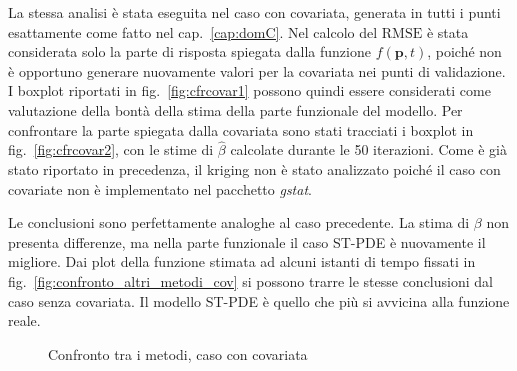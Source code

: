 \documentclass[a4paper,11pt,twoside,openright]{book}							%
\begin{document}
La stessa analisi è stata eseguita nel caso con covariata, generata in tutti i punti esattamente come fatto nel cap.~\ref{cap:domC}. Nel calcolo del $\mathrm{RMSE}$ è stata considerata solo la parte di risposta spiegata dalla funzione $f(\bm p,t)$, poiché non è opportuno generare nuovamente valori per la covariata nei punti di validazione. I boxplot riportati in fig.~\ref{fig:cfrcovar1} possono quindi essere considerati come valutazione della bontà della stima della parte funzionale del modello. Per confrontare la parte spiegata dalla covariata sono stati tracciati i boxplot in fig.~\ref{fig:cfrcovar2}, con le stime di $\hat{\beta}$ calcolate durante le 50 iterazioni. Come è già stato riportato in precedenza, il kriging non è stato analizzato poiché il caso con covariate non è implementato nel pacchetto \textit{gstat}.

Le conclusioni sono perfettamente analoghe al caso precedente. La stima di $\beta$ non presenta differenze, ma nella parte funzionale il caso ST-PDE è nuovamente il migliore. Dai plot della funzione stimata ad alcuni istanti di tempo fissati in fig.~\ref{fig:confronto_altri_metodi_cov} si possono trarre le stesse conclusioni dal caso senza covariata. Il modello ST-PDE è quello che più si avvicina alla funzione reale.

\begin{figure}[t]
	\centering
	\caption{Confronto tra i metodi, caso con covariata}
	\label{fig:cfrcovar}
\end{figure}
\end{document}
